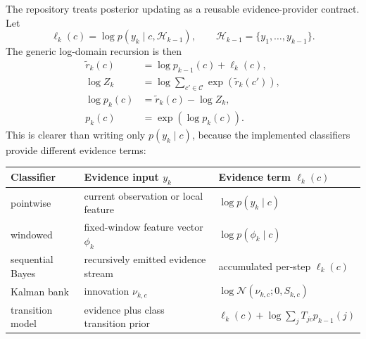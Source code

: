 \documentclass[11pt]{article}
\begin{document}
\noindent
The repository treats posterior updating as a reusable evidence-provider contract. Let
\begin{equation}
\ell_k(c) = \log p(y_k \mid c, \mathcal{H}_{k-1}),
\qquad
\mathcal{H}_{k-1} = \{y_1,\dots,y_{k-1}\}.
\end{equation}
The generic log-domain recursion is then
\begin{align}
\tilde{r}_k(c) &= \log p_{k-1}(c) + \ell_k(c), \\
\log Z_k &= \log \sum_{c' \in \mathcal{C}} \exp(\tilde{r}_k(c')), \\
\log p_k(c) &= \tilde{r}_k(c) - \log Z_k, \\
p_k(c) &= \exp(\log p_k(c)).
\end{align}
This is clearer than writing only \(p(y_k \mid c)\), because the implemented classifiers provide different evidence terms:
\begin{center}
\small
\begin{tabularx}{\textwidth}{lXX}
\toprule
Classifier & Evidence input \(y_k\) & Evidence term \(\ell_k(c)\) \\
\midrule
pointwise & current observation or local feature & \(\log p(y_k \mid c)\) \\
windowed & fixed-window feature vector \(\phi_k\) & \(\log p(\phi_k \mid c)\) \\
sequential Bayes & recursively emitted evidence stream & accumulated per-step \(\ell_k(c)\) \\
Kalman bank & innovation \(\nu_{k,c}\) & \(\log \mathcal{N}(\nu_{k,c}; 0, S_{k,c})\) \\
transition model & evidence plus class transition prior & \(\ell_k(c) + \log \sum_j T_{jc}p_{k-1}(j)\) \\
\bottomrule
\end{tabularx}
\end{center}
\end{document}
